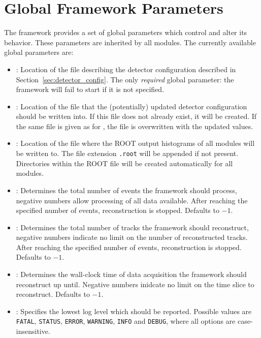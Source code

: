 \section{Global Framework Parameters}
\label{sec:framework_parameters}
The \corry framework provides a set of global parameters which control and alter its behavior. These parameters are inherited by all modules.
The currently available global parameters are:

\begin{itemize}
\item {}: Location of the file describing the detector configuration described in Section~\ref{sec:detector_config}.
The only \textit{required} global parameter: the framework will fail to start if it is not specified.
\item {}: Location of the file that the (potentially) updated detector configuration should be written into. If this file does not already exist, it will be created. If the same file is given as for , the file is overwritten with the updated values.
\item {}: Location of the file where the ROOT output histograms of all modules will be written to. The file extension \texttt{.root} will be appended if not present. Directories within the ROOT file will be created automatically for all modules.
\item {}: Determines the total number of events the framework should process, negative numbers allow processing of all data available.
After reaching the specified number of events, reconstruction is stopped.
Defaults to $-1$.
\item {}: Determines the total number of tracks the framework should reconstruct, negative numbers indicate no limit on the number of reconstructed tracks.
After reaching the specified number of events, reconstruction is stopped.
Defaults to $-1$.
\item {}: Determines the wall-clock time of data acquisition the framework should reconstruct up until. Negative numbers inidcate no limit on the time slice to reconstruct.
Defaults to $-1$.
\item {}: Specifies the lowest log level which should be reported.
Possible values are \texttt{FATAL}, \texttt{STATUS}, \texttt{ERROR}, \texttt{WARNING}, \texttt{INFO} and \texttt{DEBUG}, where all options are case-insensitive.

\end{itemize}
